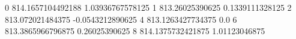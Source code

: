 0 814.1657104492188 1.03936767578125
1 813.26025390625 0.1339111328125
2 813.072021484375 -0.0543212890625
4 813.1263427734375 0.0
6 813.3865966796875 0.26025390625
8 814.1375732421875 1.01123046875
